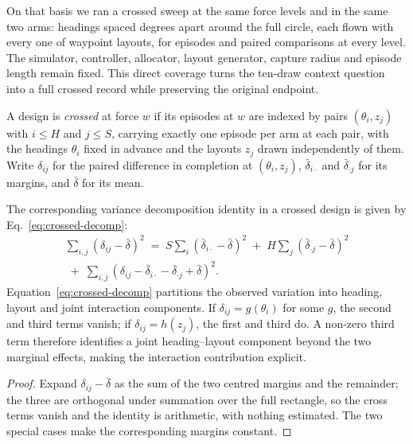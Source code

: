 On that basis we ran a crossed sweep at the same \NWindLevels{} force levels and
in the same two arms: \NAssignedHeadings{} headings spaced \HeadingStep{}
degrees apart around the full circle, each flown with every one of \NScenes{}
waypoint layouts, for \NEpisodesDesigned{} episodes and \NPairsPerForce{} paired
comparisons at every level. The simulator, controller, allocator, layout
generator, capture radius and episode length remain fixed. This direct coverage
turns the ten-draw context question into a full crossed record while preserving
the original endpoint.

\begin{definition}\label{def:crossed}
A design is \emph{crossed} at force $w$ if its episodes at $w$ are indexed by
pairs $(\theta_i, z_j)$ with $i \le H$ and $j \le S$, carrying exactly one
episode per arm at each pair, with the headings $\theta_i$ fixed in advance and
the layouts $z_j$ drawn independently of them. Write
$\delta_{ij}$ for the paired difference in completion at $(\theta_i, z_j)$,
$\bar\delta_{i\cdot}$ and $\bar\delta_{\cdot j}$ for its margins, and
$\bar\delta$ for its mean.
\end{definition}

\begin{proposition}\label{prop:crossed}
The corresponding variance decomposition identity in a crossed design is given by
Eq.~\eqref{eq:crossed-decomp}:
\begin{equation}
  \begin{aligned}
  \sum_{i,j}(\delta_{ij}-\bar\delta)^2
  \;=\; S\sum_i(\bar\delta_{i\cdot}-\bar\delta)^2
  \;+\; H\sum_j(\bar\delta_{\cdot j}-\bar\delta)^2
  \\
  \;+\; \sum_{i,j}(\delta_{ij}-\bar\delta_{i\cdot}-\bar\delta_{\cdot j}
  +\bar\delta)^2 .
\end{aligned}
\label{eq:crossed-decomp}
\end{equation}
Equation~\eqref{eq:crossed-decomp} partitions the observed variation into heading,
layout and joint interaction components.
If $\delta_{ij} = g(\theta_i)$ for some $g$, the second and third terms vanish;
if $\delta_{ij} = h(z_j)$, the first and third do. A non-zero third term
therefore identifies a joint heading--layout component beyond the two marginal
effects, making the interaction contribution explicit.
\end{proposition}

\begin{proof}
Expand $\delta_{ij}-\bar\delta$ as the sum of the two centred margins and the
remainder; the three are orthogonal under summation over the full rectangle, so
the cross terms vanish and the identity is arithmetic, with nothing estimated.
The two special cases make the corresponding margins constant.
\end{proof}

